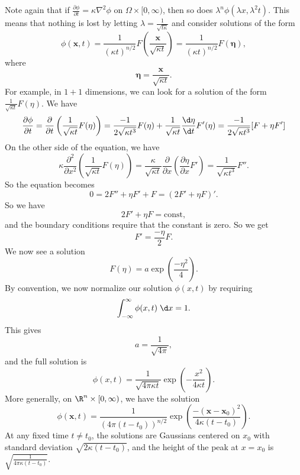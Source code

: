 \documentclass[a4paper]{article}
\begin{document}
Note again that if $\frac{\partial\phi}{\partial t} = \kappa \nabla^2 \phi$ on $\Omega\times [0, \infty)$, then so does $\lambda^n \phi(\lambda x, \lambda^2 t)$. This means that nothing is lost by letting $\lambda = \frac{1}{\sqrt{t \kappa}}$ and consider solutions of the form %
\[
  \phi(\mathbf{x}, t) = \frac{1}{(\kappa t)^{n/2}} F\left(\frac{\mathbf{x}}{\sqrt{\kappa t}}\right) = \frac{1}{(\kappa t)^{n/2}}F(\boldsymbol\eta),
\]
where
\[
  \boldsymbol\eta = \frac{\mathbf{x}}{\sqrt{\kappa t}}.
\]
For example, in $1 + 1$ dimensions, we can look for a solution of the form $\frac{1}{\sqrt{\kappa t}} F(\eta)$. We have
\[
  \frac{\partial\phi}{\partial t} = \frac{\partial}{\partial t}\left(\frac{1}{\sqrt{\kappa t}} F(\eta)\right) = \frac{-1}{2\sqrt{\kappa t^3}} F(\eta) + \frac{1}{\sqrt{\kappa t}} \frac{\d \eta}{\d t}F'(\eta) = \frac{-1}{2\sqrt{\kappa t^3}}[F + \eta F']
\]
On the other side of the equation, we have
\[
  \kappa\frac{\partial^2}{\partial x^2} \left(\frac{1}{\sqrt{\kappa t}} F(\eta)\right) = \frac{\kappa}{\sqrt{\kappa t}} \frac{\partial}{\partial x}\left(\frac{\partial \eta}{\partial x} F'\right) = \frac{1}{\sqrt{\kappa t^3}}F''.
\]
So the equation becomes
\[
  0 = 2F'' + \eta F' + F = (2F' + \eta F)'.
\]
So we have
\[
  2F' + \eta F = \text{const},
\]
and the boundary conditions require that the constant is zero. So we get
\[
  F' = \frac{-\eta}{2}F.
\]
We now see a solution
\[
  F(\eta) = a \exp\left(\frac{-\eta^2}{4}\right).
\]
By convention, we now normalize our solution $\phi(x, t)$ by requiring
\[
  \int_{-\infty}^\infty \phi(x, t)\;\d x = 1.
\]
This gives
\[
  a = \frac{1}{\sqrt{4\pi}},
\]
and the full solution is
\[
  \phi(x, t) = \frac{1}{\sqrt{4\pi \kappa t}}\exp\left(- \frac{x^2}{4\kappa t}\right).
\]
More generally, on $\R^n \times [0, \infty)$, we have the solution
\[
  \phi(\mathbf{x}, t) = \frac{1}{(4\pi (t - t_0))^{n/2}} \exp\left(\frac{-(\mathbf{x} - \mathbf{x}_0)^2}{4\kappa(t - t_0)}\right).
\]
At any fixed time $t\not= t_0$, the solutions are Gaussians centered on $x_0$ with standard deviation $\sqrt{2\kappa (t - t_0)}$, and the height of the peak at $x = x_0$ is $\sqrt{\frac{1}{4\pi \kappa (t - t_0)}}$.
\end{document}
